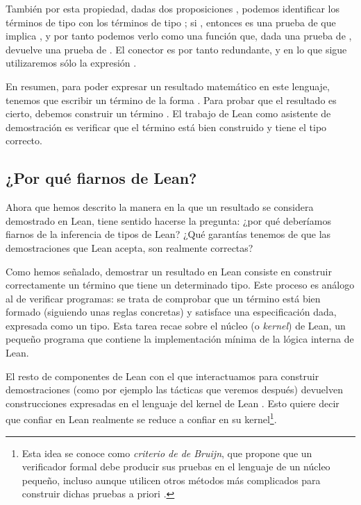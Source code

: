 También por esta propiedad, dadas dos proposiciones , podemos identificar los términos de tipo  con los términos de tipo ; si , entonces  es una prueba de que  implica , y por tanto podemos verlo como una función que, dada una prueba de , devuelve una prueba de . El conector  es por tanto redundante, y en lo que sigue utilizaremos sólo la expresión \code{$\to$}.

En resumen, para poder expresar un resultado matemático en este lenguaje, tenemos que escribir un término de la forma . Para probar que el resultado es cierto, debemos construir un término . El trabajo de Lean como asistente de demostración es verificar que el término  está bien construido y tiene el tipo correcto.


\subsection{¿Por qué fiarnos de Lean?}

Ahora que hemos descrito la manera en la que un resultado se considera demostrado en Lean, tiene sentido hacerse la pregunta: ¿por qué deberíamos fiarnos de la inferencia de tipos de Lean? ¿Qué garantías tenemos de que las demostraciones que Lean acepta, son realmente correctas? 

Como hemos señalado, demostrar un resultado en Lean consiste en construir correctamente un término que tiene un determinado tipo. Este proceso es análogo al de verificar programas: se trata de comprobar que un término está bien formado (siguiendo unas reglas concretas) y satisface una especificación dada, expresada como un tipo. Esta tarea recae sobre el núcleo (o \textit{kernel}) de Lean, un pequeño programa que contiene la implementación mínima de la lógica interna de Lean.

El resto de componentes de Lean con el que interactuamos para construir demostraciones (como por ejemplo las tácticas que veremos después) devuelven construcciones expresadas en el lenguaje del kernel de Lean \cite{bailey2024type}. Esto quiere decir que confiar en Lean realmente se reduce a confiar en su kernel\footnote{Esta idea se conoce como \textit{criterio de de Bruijn}, que propone que un verificador formal debe producir sus pruebas en el lenguaje de un núcleo pequeño, incluso aunque utilicen otros métodos más complicados para construir dichas pruebas a priori \cite{bailey2024type}.}.

